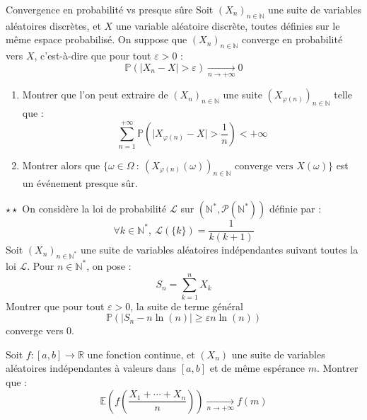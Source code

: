 \documentclass[french,a4paper]{article}
\renewcommand{\P}{\mathbb{P}}
\newcommand{\N}{\mathbb{N}}
\newcommand{\R}{\mathbb{R}}
\newcommand{\st}{^*}
\newcommand{\E}{\mathbb{E}}
\theoremstyle{plain}
\theoremstyle{definition}
\theoremstyle{remark}
\begin{document}
\begin{ex}[Moulin.78]{Convergence en probabilité vs presque sûre}
	Soit $(X_n)_{n\in\N}$ une suite de variables aléatoires discrètes, et $X$ une variable aléatoire discrète, toutes définies sur le même espace probabilisé. On suppose que $(X_n)_{n\in\N}$ converge en probabilité vers $X$, c'est-à-dire que pour tout $\varepsilon>0$ : $$\P(\lvert X_n-X\rvert>\varepsilon)\xrightarrow[n\to+\infty]{}0$$
	\begin{enumerate}
		\item Montrer que l'on peut extraire de $(X_n)_{n\in\N}$ une suite $(X_{\varphi(n)})_{n\in\N}$ telle que : $$\sum_{n=1}^{+\infty}\P\left(\lvert X_{\varphi(n)}-X\rvert>\frac{1}{n}\right)<+\infty$$
		\item Montrer alors que $\{\omega\in\Omega\ : \ (X_{\varphi(n)}(\omega))_{n\in\N}\text{ converge vers }X(\omega)\}$ est un événement presque sûr.
	\end{enumerate}
\end{ex}

\begin{ex}[Moulin.79]{$\star\star$}
	On considère la loi de probabilité $\mathcal{L}$ sur $(\N\st,\mathcal{P}(\N\st))$ définie par : $$\forall k\in\N\st,\ \mathcal{L}(\{k\})=\frac{1}{k(k+1)}$$ Soit $(X_n)_{n\in\N\st}$ une suite de variables aléatoires indépendantes suivant toutes la loi $\mathcal{L}$. Pour $n\in\N\st$, on pose : $$S_n=\sum_{k=1}^{n}X_k$$ Montrer que pour tout $\varepsilon>0$, la suite de terme général $$\P(\lvert S_n-n\ln(n)\rvert\geqslant\varepsilon n\ln(n))$$ converge vers $0$.
\end{ex}

\begin{ex}[Moulin.80]{}
	Soit $f:[a,b]\to\R$ une fonction continue, et $(X_n)$ une suite de variables aléatoires indépendantes à valeurs dans $[a,b]$ et de même espérance $m$. Montrer que : $$\E\left(f\left(\frac{X_1+\cdots+X_n}{n}\right)\right)\xrightarrow[n\to+\infty]{}f(m)$$
\end{ex}
\end{document}

